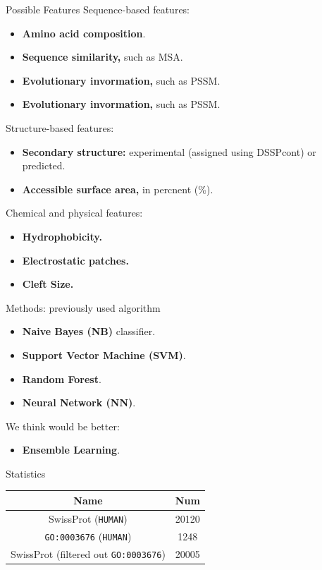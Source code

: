 \documentclass[pdf]
{beamer}
\begin{document}
\begin{frame}{Possible Features}
	Sequence-based features:
	\begin{itemize}
		\item \textbf{Amino acid composition}.
		\item \textbf{Sequence similarity,} such as MSA.
		\item \textbf{Evolutionary invormation,} such as PSSM. 
		\item \textbf{Evolutionary invormation,} such as PSSM. 
	\end{itemize}
	Structure-based features:
	\begin{itemize}
		\item \textbf{Secondary structure:} experimental (assigned using DSSPcont) or predicted.
		\item \textbf{Accessible surface area,} in percnent (\%).
	\end{itemize}
	Chemical and physical features:
	\begin{itemize}
		\item \textbf{Hydrophobicity.}
		\item \textbf{Electrostatic patches.}
		\item \textbf{Cleft Size.}
	\end{itemize}
\end{frame}

\begin{frame}{Methods: previously used algorithm}
	\begin{itemize}
		\item \textbf{Naive Bayes (NB)} classifier.
		\item \textbf{Support Vector Machine (SVM)}.
		\item \textbf{Random Forest}.
		\item \textbf{Neural Network (NN)}.
	\end{itemize}
	
	We think would be better:
	\begin{itemize}
		\item \textbf{Ensemble Learning}.
	\end{itemize}	
	
\end{frame}

\begin{frame}{Statistics}
	\begin{center}
		\begin{tabular}{| c | c |}
			\hline
			Name & Num\\
			\hline
			SwissProt (\texttt{HUMAN}) & 20120\\
			\texttt{GO:0003676} (\texttt{HUMAN}) & 1248\\
			SwissProt (filtered out \texttt{GO:0003676}) & 20005 \\
			\hline
		\end{tabular}	
	\end{center}
\end{frame}
	
\end{document}
